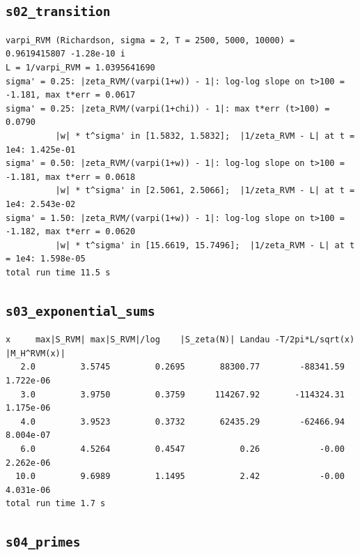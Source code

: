 \documentclass[11pt,reqno]{amsart}
\numberwithin{equation}{section}
\theoremstyle{plain}
\theoremstyle{definition}
\theoremstyle{remark}
\begin{document}
\subsection{\texttt{s02\_transition}}
\label{app:out-s02-transition}

\begin{lstlisting}[style=out]
varpi_RVM (Richardson, sigma = 2, T = 2500, 5000, 10000) = 0.9619415807 -1.28e-10 i
L = 1/varpi_RVM = 1.0395641690
sigma' = 0.25: |zeta_RVM/(varpi(1+w)) - 1|: log-log slope on t>100 = -1.181, max t*err = 0.0617
sigma' = 0.25: |zeta_RVM/(varpi(1+chi)) - 1|: max t*err (t>100) = 0.0790
          |w| * t^sigma' in [1.5832, 1.5832];  |1/zeta_RVM - L| at t = 1e4: 1.425e-01
sigma' = 0.50: |zeta_RVM/(varpi(1+w)) - 1|: log-log slope on t>100 = -1.181, max t*err = 0.0618
          |w| * t^sigma' in [2.5061, 2.5066];  |1/zeta_RVM - L| at t = 1e4: 2.543e-02
sigma' = 1.50: |zeta_RVM/(varpi(1+w)) - 1|: log-log slope on t>100 = -1.182, max t*err = 0.0620
          |w| * t^sigma' in [15.6619, 15.7496];  |1/zeta_RVM - L| at t = 1e4: 1.598e-05
total run time 11.5 s
\end{lstlisting}

\subsection{\texttt{s03\_exponential\_sums}}
\label{app:out-s03-exponential-sums}

\begin{lstlisting}[style=out]
     x     max|S_RVM| max|S_RVM|/log    |S_zeta(N)| Landau -T/2pi*L/sqrt(x)   |M_H^RVM(x)|
   2.0         3.5745         0.2695       88300.77        -88341.59      1.722e-06
   3.0         3.9750         0.3759      114267.92       -114324.31      1.175e-06
   4.0         3.9523         0.3732       62435.29        -62466.94      8.004e-07
   6.0         4.5264         0.4547           0.26            -0.00      2.262e-06
  10.0         9.6989         1.1495           2.42            -0.00      4.031e-06
total run time 1.7 s
\end{lstlisting}

\subsection{\texttt{s04\_primes}}
\label{app:out-s04-primes}
\end{document}
